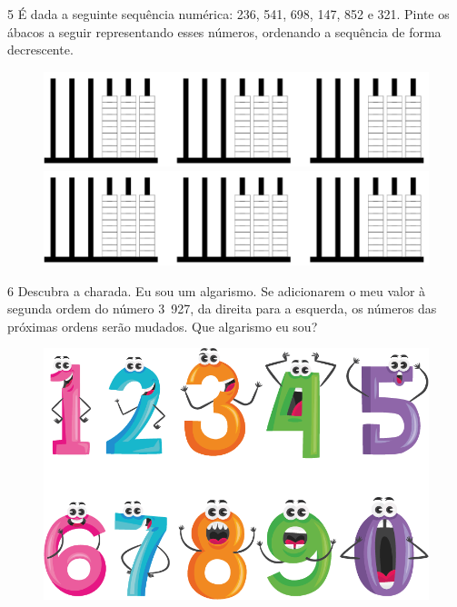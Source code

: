 

\num{5} É dada a seguinte sequência numérica: 236, 541, 698, 147, 852 e 321. Pinte os
ábacos a seguir representando esses números, ordenando a sequência de forma decrescente.

\begin{figure}[htpb!]
\includegraphics[width=\textwidth]{./media/image7b.png}
\includegraphics[width=\textwidth]{./media/image7b.png}
\end{figure}

\pagebreak


\num{6} Descubra a charada. Eu sou um algarismo. Se adicionarem o meu valor à
segunda ordem do número 3~927, da direita para a esquerda, os números das próximas
ordens serão mudados. Que algarismo eu sou?


\begin{figure}[htpb!]
\includegraphics[width=\textwidth]{./media/image8.png}
\end{figure}

